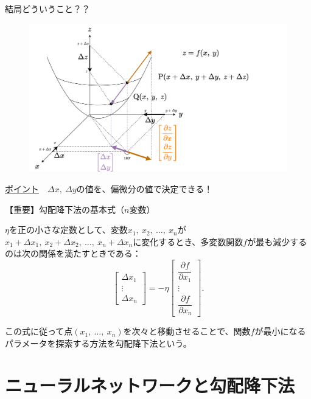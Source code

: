 \documentclass[dvipdfmx,aspectratio=169]{beamer}
\begin{document}
	\begin{frame}{結局どういうこと？？}
		\begin{figure}
			\centering
			\includegraphics[width=0.7\linewidth]{img/visualization-of-the-basic-equation-of-the-gradient-descent-method}
		\end{figure}
		\underline{ポイント}　$ \Delta x,\ \Delta y $の値を、偏微分の値で決定できる！
	\end{frame}
	\begin{frame}{【重要】勾配降下法の基本式（$ n $変数）}
		\begin{screen}
			$ \eta $を正の小さな定数として、変数$ x_1,\ x_2,\ \dots,\ x_n $が$ x_1 + \Delta x_1,\ x_2 + \Delta x_2,\ \dots,\ x_n + \Delta x_n $に変化するとき、多変数関数$ f $が最も減少するのは次の関係を満たすときである：
			\begin{equation}\label{eq:basic-equation-of-the-gradient-descent-method}
				\begin{bmatrix}
					\Delta x_1\\
					\vdots\\
					\Delta x_n
				\end{bmatrix} = -\eta \begin{bmatrix}
					\dfrac{\partial f}{\partial x_1}\\
					\vdots\\
					\dfrac{\partial f}{\partial x_n}
				\end{bmatrix}.
			\end{equation}
		\end{screen}
		この式に従って点$ (x_1,\ \dots,\ x_n) $を次々と移動させることで、関数$ f $が最小になるパラメータを探索する方法を\alert{勾配降下法}という。
	\end{frame}

	\section{ニューラルネットワークと勾配降下法}
\end{document}
